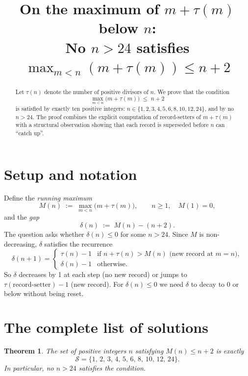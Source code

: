 \documentclass[11pt]{article}
\newtheorem{theorem}{Theorem}
\begin{document}
\title{On the maximum of $m + \tau(m)$ below $n$:\\
No $n > 24$ satisfies $\displaystyle\max_{m < n}(m+\tau(m)) \leq n+2$}
\author{}
\date{}
\maketitle

\begin{abstract}
Let $\tau(n)$ denote the number of positive divisors of $n$.  We prove that
the condition
\[
  \max_{m < n}\bigl(m + \tau(m)\bigr) \;\leq\; n + 2
\]
is satisfied by exactly ten positive integers:
$n \in \{1, 2, 3, 4, 5, 6, 8, 10, 12, 24\}$,
and by no $n > 24$.
The proof combines the explicit computation of record-setters of $m + \tau(m)$
with a structural observation showing that each record is superseded before $n$
can ``catch up''.
\end{abstract}

\section{Setup and notation}

Define the \emph{running maximum}
\[
  M(n) \;:=\; \max_{m < n}\bigl(m + \tau(m)\bigr),
  \qquad n \geq 1,\quad M(1) = 0,
\]
and the \emph{gap}
\[
  \delta(n) \;:=\; M(n) - (n+2).
\]
The question asks whether $\delta(n) \leq 0$ for some $n > 24$.
Since $M$ is non-decreasing, $\delta$ satisfies the recurrence
\begin{equation}\label{eq:recurrence}
  \delta(n+1) = \begin{cases}
    \tau(n) - 1 & \text{if } n + \tau(n) > M(n) \text{ (new record at } m=n\text{)}, \\
    \delta(n) - 1 & \text{otherwise.}
  \end{cases}
\end{equation}
So $\delta$ decreases by 1 at each step (no new record) or jumps to
$\tau(\text{record-setter}) - 1$ (new record).  For $\delta(n) \leq 0$
we need $\delta$ to decay to 0 or below without being reset.

\section{The complete list of solutions}

\begin{theorem}\label{thm:main}
The set of positive integers $n$ satisfying $M(n) \leq n + 2$ is exactly
\[
  \mathcal{S} = \{1,\, 2,\, 3,\, 4,\, 5,\, 6,\, 8,\, 10,\, 12,\, 24\}.
\]
In particular, no $n > 24$ satisfies the condition.
\end{theorem}
\end{document}
